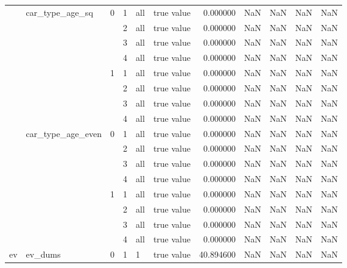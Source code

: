 \begin{tabular}{llllllrrrrr}
\cline{2-11} \cline{3-11} \cline{4-11} \cline{5-11}
 & \multirow[t]{8}{*}{car_type_age_sq} & \multirow[t]{4}{*}{0} & 1 & all & true value & 0.000000 & NaN & NaN & NaN & NaN \\
\cline{4-11} \cline{5-11}
 &  &  & 2 & all & true value & 0.000000 & NaN & NaN & NaN & NaN \\
\cline{4-11} \cline{5-11}
 &  &  & 3 & all & true value & 0.000000 & NaN & NaN & NaN & NaN \\
\cline{4-11} \cline{5-11}
 &  &  & 4 & all & true value & 0.000000 & NaN & NaN & NaN & NaN \\
\cline{3-11} \cline{4-11} \cline{5-11}
 &  & \multirow[t]{4}{*}{1} & 1 & all & true value & 0.000000 & NaN & NaN & NaN & NaN \\
\cline{4-11} \cline{5-11}
 &  &  & 2 & all & true value & 0.000000 & NaN & NaN & NaN & NaN \\
\cline{4-11} \cline{5-11}
 &  &  & 3 & all & true value & 0.000000 & NaN & NaN & NaN & NaN \\
\cline{4-11} \cline{5-11}
 &  &  & 4 & all & true value & 0.000000 & NaN & NaN & NaN & NaN \\
\cline{2-11} \cline{3-11} \cline{4-11} \cline{5-11}
 & \multirow[t]{8}{*}{car_type_age_even} & \multirow[t]{4}{*}{0} & 1 & all & true value & 0.000000 & NaN & NaN & NaN & NaN \\
\cline{4-11} \cline{5-11}
 &  &  & 2 & all & true value & 0.000000 & NaN & NaN & NaN & NaN \\
\cline{4-11} \cline{5-11}
 &  &  & 3 & all & true value & 0.000000 & NaN & NaN & NaN & NaN \\
\cline{4-11} \cline{5-11}
 &  &  & 4 & all & true value & 0.000000 & NaN & NaN & NaN & NaN \\
\cline{3-11} \cline{4-11} \cline{5-11}
 &  & \multirow[t]{4}{*}{1} & 1 & all & true value & 0.000000 & NaN & NaN & NaN & NaN \\
\cline{4-11} \cline{5-11}
 &  &  & 2 & all & true value & 0.000000 & NaN & NaN & NaN & NaN \\
\cline{4-11} \cline{5-11}
 &  &  & 3 & all & true value & 0.000000 & NaN & NaN & NaN & NaN \\
\cline{4-11} \cline{5-11}
 &  &  & 4 & all & true value & 0.000000 & NaN & NaN & NaN & NaN \\
\cline{1-11} \cline{2-11} \cline{3-11} \cline{4-11} \cline{5-11}
\multirow[t]{202}{*}{ev} & \multirow[t]{202}{*}{ev_dums} & \multirow[t]{101}{*}{0} & \multirow[t]{25}{*}{1} & 1 & true value & 40.894600 & NaN & NaN & NaN & NaN \\

\end{tabular}
